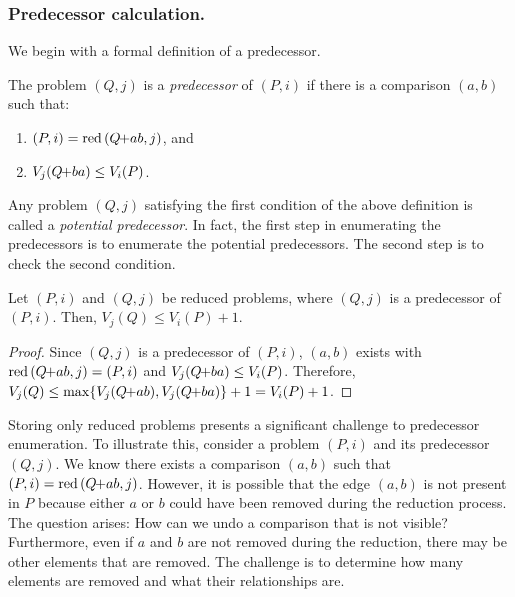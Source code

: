 \documentclass[a4paper,UKenglish,cleveref, autoref, thm-restate]{lipics-v2021}
\newcommand{\pchild}[3]{{#1}\kern-1pt{+}{#2}{#3}}
\newcommand{\reduced}[1]{\operatorname{red}{#1}}
\begin{document}
\subsubsection{Predecessor calculation.} \label{sec:backward:predecessor_calculation}
We begin with a formal definition of a predecessor.

\begin{definition}[Predecessor] \label{definition:predecessor_calculation}
  The problem $(Q, j)$ is a \emph{predecessor} of $(P, i)$ if there is a comparison $(a, b)$ such that:
  \begin{enumerate}
    \item $(P, i) = \reduced(\pchild{Q}{a}{b}, j)$, and
    \item $V_j(\pchild{Q}{b}{a}) \leq V_i(P)$.
  \end{enumerate}
\end{definition}

Any problem $(Q, j)$ satisfying the first condition of the above definition is called a \emph{potential predecessor}.
In fact, the first step in enumerating the predecessors is to enumerate the potential predecessors.
The second step is to check the second condition.

\begin{lemma} \label{lemma:predecessor_calculation}
  Let $(P, i)$ and $(Q, j)$ be reduced problems, where $(Q, j)$ is a predecessor of $(P, i)$.
  Then, $V_j(Q) \leq V_i(P) + 1$.
\end{lemma}

\begin{proof} \label{proof:predecessor_calculation}
  Since $(Q, j)$ is a predecessor of $(P, i)$, $(a, b)$ exists with $\reduced{(\pchild{Q}{a}{b}, j)} = (P, i)$ and $V_j(\pchild{Q}{b}{a}) \leq V_i(P)$.
  Therefore, $V_j(Q) \leq \max\{V_j(\pchild{Q}{a}{b}), V_j(\pchild{Q}{b}{a})\} + 1 = V_i(P) + 1$.
\end{proof}

Storing only reduced problems presents a significant challenge to predecessor enumeration.
To illustrate this, consider a problem $(P, i)$ and its predecessor $(Q, j)$.
We know there exists a comparison $(a, b)$ such that $(P, i) = \reduced(\pchild{Q}{a}{b}, j)$.
However, it is possible that the edge $(a, b)$ is not present in $P$ because either $a$ or $b$ could have been removed during the reduction process.
The question arises: How can we undo a comparison that is not visible?
Furthermore, even if $a$ and $b$ are not removed during the reduction, there may be other elements that are removed.
The challenge is to determine how many elements are removed and what their relationships are.
\end{document}
